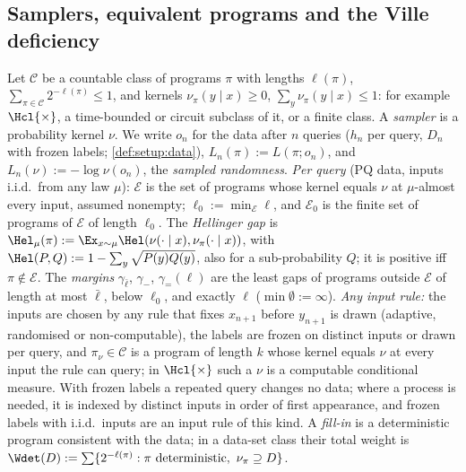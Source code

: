 \subsection{Samplers, equivalent programs and the Ville deficiency}\label{sec:split:setting}

\begin{definition}\label{def:split:setting}
Let $\mathcal C$ be a countable class of programs $\pi$ with lengths $\ell(\pi)$, $\sum_{\pi\in\mathcal C}2^{-\ell(\pi)}\le1$, and kernels $\nu_\pi(y\mid x)\ge0$, $\sum_y\nu_\pi(y\mid x)\le1$: for example $\Hcl{\times}$, a time-bounded or circuit subclass of it, or a finite class. A \emph{sampler} is a probability kernel $\nu$. We write $o_n$ for the data after $n$ queries ($h_n$ per query, $D_n$ with frozen labels; \cref{def:setup:data}), $L_n(\pi):=L(\pi;o_n)$, and $L_n(\nu):=-\log\nu(o_n)$, the \emph{sampled randomness}.
\emph{Per query} (PQ data, inputs i.i.d.\ from any law $\mu$): $\mathcal E$ is the set of programs whose kernel equals $\nu$ at $\mu$-almost every input, assumed nonempty; $\ell_0:=\min_{\mathcal E}\ell$, and $\mathcal E_0$ is the finite set of programs of $\mathcal E$ of length $\ell_0$. The \emph{Hellinger gap} is ${\Hel}_\mu(\pi):=\Ex_{x\sim\mu}\Hel(\nu(\cdot\mid x),\nu_\pi(\cdot\mid x))$, with $\Hel(P,Q):=1-\sum_y\sqrt{P(y)Q(y)}$, also for a sub-probability $Q$; it is positive iff $\pi\notin\mathcal E$. The \emph{margins} $\gamma_{\bar\ell}$, $\gamma_-$, $\gamma_=(\ell)$ are the least gaps of programs outside $\mathcal E$ of length at most $\bar\ell$, below $\ell_0$, and exactly $\ell$ ($\min\emptyset:=\infty$).
\emph{Any input rule:} the inputs are chosen by any rule that fixes $x_{n+1}$ before $y_{n+1}$ is drawn (adaptive, randomised or non-computable), the labels are frozen on distinct inputs or drawn per query, and $\pi_\nu\in\mathcal C$ is a program of length $k$ whose kernel equals $\nu$ at every input the rule can query; in $\Hcl{\times}$ such a $\nu$ is a computable conditional measure. With frozen labels a repeated query changes no data; where a process is needed, it is indexed by distinct inputs in order of first appearance, and frozen labels with i.i.d.\ inputs are an input rule of this kind.
A \emph{fill-in} is a deterministic program consistent with the data; in a data-set class their total weight is $\Wdet(D):=\sum\{2^{-\ell(\pi)}:\pi\text{ deterministic},\ \nu_\pi\supseteq D\}$.
\end{definition}

